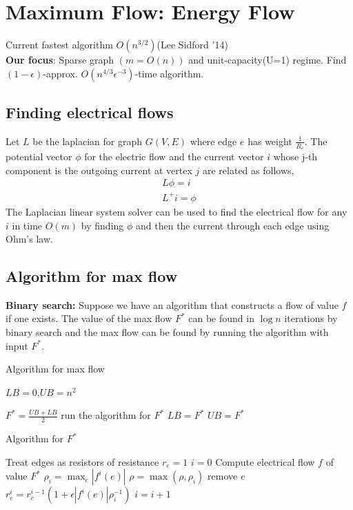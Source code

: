 \section{Maximum Flow: Energy Flow}
Current fastest algorithm $O(n^{3/2})$(Lee Sidford '14)\\
\textbf{Our focus}: Sparse graph $(m=O(n))$ and unit-capacity(U=1) regime.
Find $(1-\epsilon)$-approx. $O(n^{4/3}\epsilon^{-3})$-time algorithm.

\subsection{Finding electrical flows}
Let $L$ be the laplacian for graph $G(V,E)$ where edge $e$ has weight $\frac{1}{R_e }$.  The potential vector $\phi$ for the electric flow and the current vector $i$ whose j-th
component is the outgoing current at vertex $j$ are related as follows,
\begin{equation}
\begin{aligned}
    L\phi=i \\
    L^+i=\phi
    \end{aligned}
\end{equation}
The Laplacian linear system solver can be used to find the electrical flow for any $i$ in time $O(m)$ by finding $\phi$ and then the current through each edge using Ohm's law.

\subsection{Algorithm for max flow}
\textbf{Binary search:} Suppose we have an algorithm that constructs a flow of value $f$ if one exists. The value of the max flow $F^*$ can be found in $\log n$ iterations by binary search and the max flow can be found by running the algorithm with input $F^*$.
\begin{algorithm}[H]
\caption{Algorithm for max flow}
\begin{algorithmic}[1]
\STATE $LB=0$,$UB=n^2$

    \STATE  $F^*=\frac{UB+LB}{2}$
    \STATE run the algorithm for $F^*$
        \STATE $LB=F^*$
    \ELSE
        \STATE $UB=F^*$
     \ENDIF
\ENDWHILE
\end{algorithmic}
\end{algorithm}

\begin{algorithm}[H]
\caption{Algorithm for $F^*$}
\begin{algorithmic}[1]
\STATE Treat edges as resistors of resistance $r_e=1$
\STATE $i=0$
    \STATE Compute electrical flow $f$ of value $F^*$
    \STATE $\rho_i=\max_e|f^i(e)|$
    \STATE $\rho=\max(\rho,\rho_i)$
            \STATE remove $e$
        \ELSE
            \STATE $r^i_e=r_e^{i-1}(1+\epsilon|f^i(e)|\rho^{-1}_i)$
            \STATE $i=i+1$
        \ENDIF
    \ENDFOR
\ENDWHILE


\end{algorithmic}
\end{algorithm}